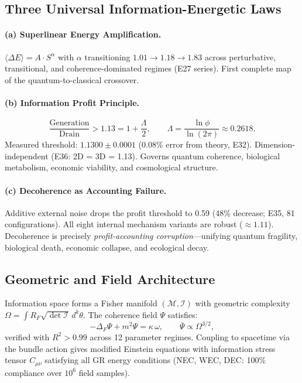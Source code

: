 \documentclass[11pt]{article}
\newcommand{\Man}{\mathcal{M}}
\begin{document}
\subsection{Three Universal Information-Energetic Laws}

\paragraph{(a) Superlinear Energy Amplification.}
$\langle\Delta E\rangle=A\cdot S^\alpha$ with $\alpha$ transitioning $1.01\to1.18\to1.83$ across perturbative, transitional, and coherence-dominated regimes (E27 series). First complete map of the quantum-to-classical crossover.

\paragraph{(b) Information Profit Principle.}
\[
\boxed{\frac{\text{Generation}}{\text{Drain}} > 1.13 = 1+\frac{\Lambda}{2}},
\qquad
\Lambda=\frac{\ln\phi}{\ln(2\pi)}\approx0.2618.
\]
Measured threshold: $1.1300\pm0.0001$ (0.08\% error from theory, E32). Dimension-independent (E36: 2D = 3D = 1.13). Governs quantum coherence, biological metabolism, economic viability, and cosmological structure.

\paragraph{(c) Decoherence as Accounting Failure.}
Additive external noise drops the profit threshold to 0.59 (48\% decrease; E35, 81 configurations). All eight internal mechanism variants are robust ($\approx1.11$). Decoherence is precisely \emph{profit-accounting corruption}---unifying quantum fragility, biological death, economic collapse, and ecological decay.

\subsection{Geometric and Field Architecture}

Information space forms a Fisher manifold $(\Man,\mathcal I)$ with geometric complexity $\Omega=\int R_F\sqrt{\det\mathcal I}\,d^k\theta$. The coherence field $\Psi$ satisfies:
\[
-\Delta_F\Psi+m^2\Psi=\kappa\,\omega,\qquad\overline\Psi\propto\Omega^{3/2},
\]
verified with $R^2>0.99$ across 12 parameter regimes. Coupling to spacetime via the bundle action gives modified Einstein equations with information stress tensor $C_{\mu\nu}$ satisfying all GR energy conditions (NEC, WEC, DEC: 100\% compliance over $10^6$ field samples).
\end{document}
